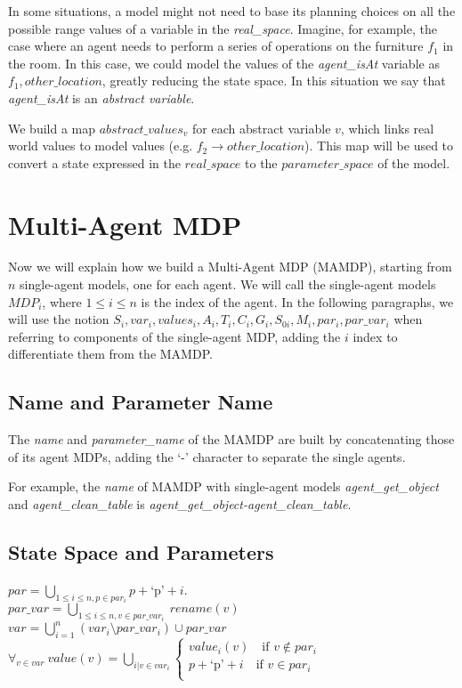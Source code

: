 In some situations, a model might not need to base its planning choices on all the possible range values of a variable in the \textit{real\_space}. Imagine, for example, the case where an agent needs to perform a series of operations on the furniture $f_1$ in the room. In this case, we could model the  values of the \textit{agent\_isAt} variable as ${f_1 , other\_location}$, greatly reducing the state space. In this situation we say that \textit{agent\_isAt} is an \textit{abstract variable}. 

We build a map $abstract\_values_v$ for each abstract variable $v$, which links real world values to model values (e.g. $f_2 \rightarrow other\_location$). This map will be used to convert a state expressed in the $real\_space$ to the $parameter\_space$ of the model. 

\section{Multi-Agent MDP}
Now we will explain how we build a Multi-Agent MDP (MAMDP), starting from $n$ single-agent models, one for each agent. We will call the single-agent models $MDP_i$, where $1 \leq i \leq n $ is the index of the agent. In the following paragraphs, we will use the notion $S_i, var_i, values_i, A_i, T_i, C_i, G_i, S_{0i}, M_i, par_i, par\_var_i$ when referring to components of the single-agent MDP, adding the $i$ index to differentiate them from the MAMDP. 
 
\subsection{Name and Parameter Name}
The \textit{name} and \textit{parameter\_name} of the MAMDP are built by concatenating those of its agent MDPs, adding the `-' character to separate the single agents.

For example, the \textit{name} of MAMDP with single-agent models \textit{agent\_get\_object} and  \textit{agent\_clean\_table} is \textit{agent\_get\_object-agent\_clean\_table}.

\subsection{State Space and Parameters}
$par=\bigcup_{1 \leq i \leq n, p \in par_i} p+\text{`p'}+i $. \\
$par\_var=\bigcup_{1 \leq i \leq n, v \in par\_var_i} \> rename(v)$ \\
$var=\bigcup_{i=1}^{n}(var_i \setminus par\_var_i) \cup par\_var$ \\
$\forall_{v \in var}\> value(v)=\bigcup_{i| v \in var_i} 
\begin{cases}
	 value_i(v) \quad \text{if } v \not \in par_i \\
	 p+\text{`p'}+i \quad \text{if } v \in par_i \\
\end{cases}$ \\ 


